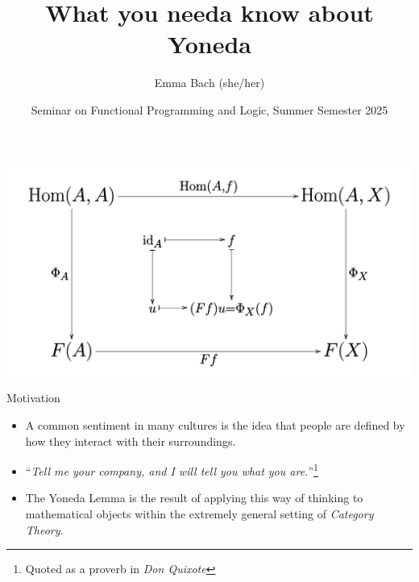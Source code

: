 \documentclass[aspectratio=169]{beamer} %
\title{What you needa know about Yoneda}
\author{Emma Bach (she/her)}
\date{Seminar on Functional Programming and Logic, Summer Semester 2025}
\begin{document}
{

\begin{frame}[plain]
    \includegraphics[width=0.4\paperwidth]{figures/Yoneda_lemma_cd.svg.png}
    \titlepage
\end{frame}

\begin{frame}{Motivation}
 \begin{itemize}
  \item A common sentiment in many cultures is the idea that people are defined by how they interact with their surroundings.
  \item ``\textit{Tell me your company, and I will tell you what you are.}''\footnote{Quoted as a proverb in \textit{Don Quixote}}
  \item The Yoneda Lemma is the result of applying this way of thinking to mathematical objects within the extremely general setting of \textit{Category Theory}.
 \end{itemize}


\end{frame}}
\end{document}
